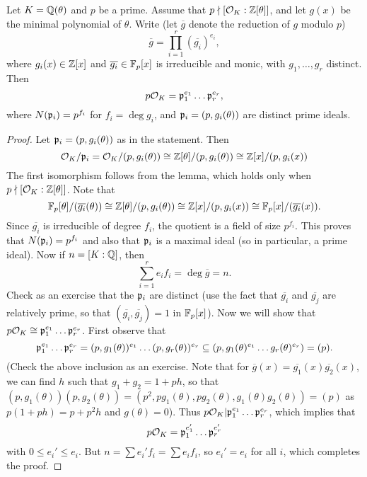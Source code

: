 \begin{theorem}[Kummer]
  Let $K = \mathbb{Q}(\theta)$ and $p$ be a prime.
  Assume that $p \nmid [\mathcal{O}_K : \mathbb{Z}[\theta]]$, and let
  $g(x)$ be the minimal polynomial of $\theta$.
  Write (let $\overline{g}$ denote the reduction of
  $g$ modulo $p$)
  \[
    \overline{g} = \prod_{i = 1}^r (\overline{g_i})^{e_i},
  \]
  where $g_i(x) \in \mathbb{Z}[x]$ and $\overline{g_i} \in \mathbb{F}_p[x]$
  is irreducible and monic, with
  $g_1, \dots, g_r$ distinct. Then
  \[
    p \mathcal{O}_K = \mathfrak{p}_1^{e_1} \dots \mathfrak{p}_r^{e_r},
  \]
  where $N(\mathfrak{p}_i) = p^{f_i}$ for $f_i = \deg g_i$, and
  $\mathfrak{p}_i = (p, g_i(\theta))$ are distinct prime ideals.
\end{theorem}

\begin{proof}
  Let $\mathfrak{p}_i = (p, g_i(\theta))$ as in the statement.
  Then
  \[
    \mathcal{O}_K / \mathfrak{p}_i = \mathcal{O}_K / (p, g_i(\theta))
    \cong \mathbb{Z}[\theta] / (p, g_i(\theta))
    \cong \mathbb{Z}[x] / (p, g_i(x))
  \]
  The first isomorphism follows from the lemma, which
  holds only when $p \nmid [\mathcal{O}_K : \mathbb{Z}[\theta]]$.
  Note that
  \[
    \mathbb{F}_p[\theta] / (\overline{g_i}(\theta)) \cong \mathbb{Z}[\theta] / (p, g_i(\theta))
    \cong \mathbb{Z}[x] / (p, g_i(x))
    \cong \mathbb{F}_p[x] / (\overline{g_i}(x)).
  \]
  Since $\overline{g_i}$ is irreducible of
  degree $f_i$, the quotient is a field of size
  $p^{f_i}$. This proves that $N(\mathfrak{p}_i) = p^{f_i}$
  and also that $\mathfrak{p}_i$ is a maximal ideal (so in
  particular, a prime ideal).
  Now if $n = [K : \mathbb{Q}]$, then
  \[
    \sum_{i = 1}^r e_i f_i = \deg \overline{g} = n.
  \]
  Check as an exercise that the $\mathfrak{p}_i$ are distinct
  (use the fact that $\overline{g_i}$ and
  $\overline{g_j}$ are relatively prime, so that
  $(\overline{g_i}, \overline{g_j}) = 1$ in $\mathbb{F}_p[x]$).
  Now we will show that $p \mathcal{O}_K \cong \mathfrak{p}_1^{e_1} \dots \mathfrak{p}_r^{e_r}$.
  First observe that
  \[
    \mathfrak{p}_1^{e_1} \dots \mathfrak{p}_r^{e_r} = (p, g_1(\theta))^{e_1} \dots (p, g_r(\theta))^{e_r}
    \subseteq (p, g_1(\theta)^{e_1} \dots g_r(\theta)^{e_r}) = (p).
  \]
  (Check the above inclusion as an exercise. Note that
  for $\overline{g}(x) = \overline{g_1}(x) \overline{g_2}(x)$, we can find $h$ such that $g_1 + g_2 = 1 + ph$, so
  that $(p, g_1(\theta))(p, g_2(\theta)) = (p^2, p g_1(\theta), p g_2(\theta), g_1(\theta) g_2(\theta)) = (p)$ as
  $p(1 + ph) = p + p^2 h$ and $g(\theta) = 0$).
  Thus $p \mathcal{O}_K | \mathfrak{p}_1^{e_1} \dots \mathfrak{p}_r^{e_r}$, which
  implies that
  \[
    p \mathcal{O}_K = \mathfrak{p}_1^{e_1'} \dots \mathfrak{p}_r^{e_r'}
  \]
  with $0 \le e_i' \le e_i$. But $n = \sum e_i' f_i = \sum e_i f_i$, so $e_i' = e_i$ for all $i$,
  which completes the proof.
\end{proof}

